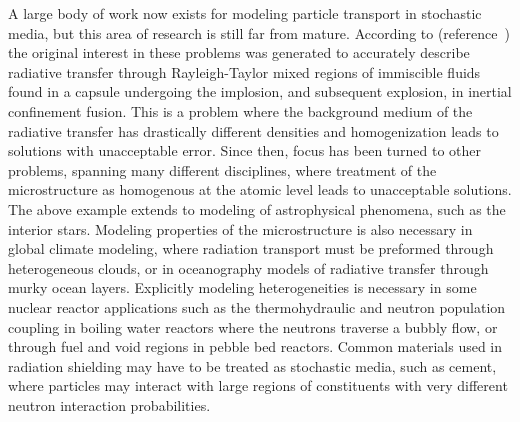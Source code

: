\noindent
	\indent A large body of work now exists for modeling particle transport in stochastic media,
	but this area of research is still far from mature.  According to (reference~\cite{Lew:93}) the
	original interest in these problems was generated to accurately describe radiative transfer 
	through Rayleigh-Taylor mixed regions of immiscible fluids found in a capsule undergoing
	the implosion, and subsequent explosion, in inertial confinement fusion.  This is a problem
	where the background medium of the radiative transfer has drastically different densities
	and homogenization leads to solutions with unacceptable error.  Since then, focus has 
	been turned to other problems, spanning many different disciplines, where treatment of
	the microstructure as homogenous at the atomic level leads to unacceptable solutions.
	The above example extends to modeling of astrophysical phenomena, such as the interior
	stars.  Modeling properties of the microstructure is also necessary in global climate 
	modeling, where radiation transport must be preformed through heterogeneous clouds,
	or in oceanography models of radiative transfer through murky ocean layers.  Explicitly
	modeling heterogeneities is necessary in some nuclear reactor applications such as
	the thermohydraulic and neutron population coupling in boiling water reactors where 
	the neutrons traverse a bubbly flow, or through fuel and void regions in pebble bed
	reactors.  Common materials used in radiation shielding may have to be treated as
	stochastic media, such as cement, where particles may interact with large regions of
	constituents with very different neutron interaction probabilities.
	
